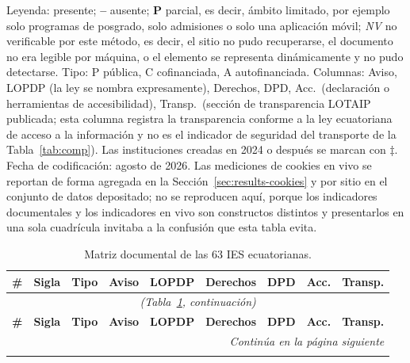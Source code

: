 \documentclass[pdflatex,sn-basic,Numbered,iicol]{sn-jnl}
\newcommand{\si}{\ding{51}}
\newcommand{\no}{\textcolor{gris}{\textbf{--}}}
\newcommand{\nv}{\textsl{\footnotesize NV}}
\theoremstyle{thmstyleone}
\theoremstyle{thmstyletwo}
\theoremstyle{thmstylethree}
\begin{document}
\begin{appendices}
Leyenda: \si{} presente; \no{} ausente; \textbf{P} parcial, es decir, \'ambito limitado, por ejemplo solo programas de posgrado, solo admisiones o solo una aplicaci\'on m\'ovil; \nv{} no verificable por este m\'etodo, es decir, el sitio no pudo recuperarse, el documento no era legible por m\'aquina, o el elemento se representa din\'amicamente y no pudo detectarse. Tipo: P p\'ublica, C cofinanciada, A autofinanciada. Columnas: Aviso, LOPDP (la ley se nombra expresamente), Derechos, DPD, Acc.\ (declaraci\'on o herramientas de accesibilidad), Transp.\ (secci\'on de transparencia LOTAIP publicada; esta columna registra la transparencia conforme a la ley ecuatoriana de acceso a la informaci\'on y no es el indicador de seguridad del transporte de la Tabla~\ref{tab:comp}). Las instituciones creadas en 2024 o despu\'es se marcan con $\ddagger$. Fecha de codificaci\'on: agosto de 2026. Las mediciones de cookies en vivo se reportan de forma agregada en la Secci\'on~\ref{sec:results-cookies} y por sitio en el conjunto de datos depositado; no se reproducen aqu\'i, porque los indicadores documentales y los indicadores en vivo son constructos distintos y presentarlos en una sola cuadr\'icula invitaba a la confusi\'on que esta tabla evita.

\footnotesize
\begin{longtable}{@{}r l c c c c c c c@{}}
	\caption{Matriz documental de las 63 IES ecuatorianas.}\label{tab:ecuador}\\
	\toprule
	\textbf{\#} & \textbf{Sigla} & \textbf{Tipo} & \textbf{Aviso} & \textbf{LOPDP} & \textbf{Derechos} & \textbf{DPD} & \textbf{Acc.} & \textbf{Transp.} \\
	\midrule
	\endfirsthead
	\multicolumn{9}{c}{\textit{(Tabla~\ref{tab:ecuador}, continuaci\'on)}}\\
	\toprule
	\textbf{\#} & \textbf{Sigla} & \textbf{Tipo} & \textbf{Aviso} & \textbf{LOPDP} & \textbf{Derechos} & \textbf{DPD} & \textbf{Acc.} & \textbf{Transp.} \\
	\midrule
	\endhead
	\midrule
	\multicolumn{9}{r}{\textit{Contin\'ua en la p\'agina siguiente}}\\
	\endfoot
	\bottomrule
	\endlastfoot


\end{longtable}
\end{appendices}
\end{document}
